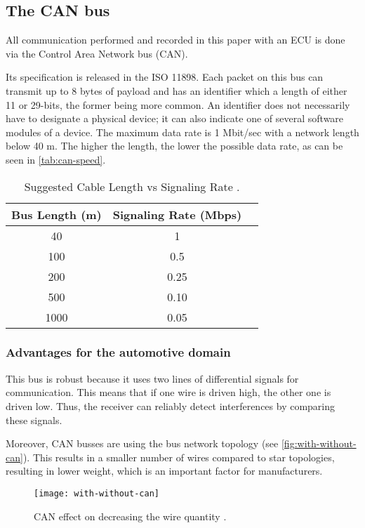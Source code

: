 \subsection{The CAN bus}

All communication performed and recorded in this paper with an ECU is done via the Control Area Network bus (CAN).

 Its specification is released in the ISO 11898. Each packet on this bus can transmit up to 8 bytes of payload and has an identifier which a length of either 11 or 29-bits, the former being more common. An identifier does not necessarily have to designate a physical device; it can also indicate one of several software modules of a device.
 The maximum data rate is 1 Mbit/sec with a network length below 40 m. The higher the length, the lower the possible data rate, as can be seen in \autoref{tab:can-speed}.

\begin{table}[h]
    \centering
    \begin{tabular}{ccc}
    \hline
    \textbf{Bus Length (m)} & \textbf{Signaling Rate (Mbps)}\\
    \hline
    40 & 1 \\
    100 & 0.5 \\
    200 & 0.25 \\
    500 & 0.10 \\
    1000 & 0.05 \\
    \hline
\end{tabular}
\caption{Suggested Cable Length vs Signaling Rate \cite{slla270}.}
\label{tab:can-speed}
\end{table}

\subsubsection{Advantages for the automotive domain}

This bus is robust because it uses two lines of differential signals for communication. This means that if one wire is driven high, the other one is driven low. Thus, the receiver can reliably detect interferences by comparing these signals.

Moreover, CAN busses are using the bus network topology (see \autoref{fig:with-without-can}). This results in a smaller number of wires compared to star topologies, resulting in lower weight, which is an important factor for manufacturers.

\begin{figure}[h]
    \centering
    \texttt{[image: with-without-can]}
    \caption{CAN effect on decreasing the wire quantity \cite{Sharma2016}.}
    \label{fig:with-without-can}
\end{figure}

